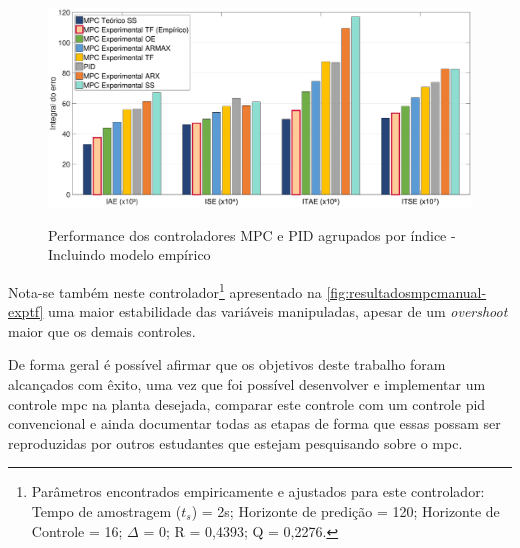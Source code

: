 \begin{figure}[!h]
	\caption{Performance dos controladores MPC e PID agrupados por índice - Incluindo modelo empírico}
	\begin{center}
		\includegraphics[width=1.00\textwidth]{./5_images/ResultadosPerformance_comManual.eps} 
		\label{fig:resultados_performance_com_manual}
	\end{center}
	\centering
\end{figure}

Nota-se também neste controlador\footnote{
    Parâmetros encontrados empiricamente e ajustados para este controlador: Tempo de amostragem ($t_s$) = 2s; Horizonte de predição = 120;
    Horizonte de Controle = 16; $\Delta$ = 0; R = 0,4393; Q = 0,2276.
} apresentado na \cref{fig:resultadosmpcmanual-exptf} uma maior estabilidade
das variáveis manipuladas, apesar de um \textit{overshoot} maior que os demais controles.

De forma geral é possível afirmar que os objetivos deste trabalho foram alcançados com êxito, uma vez que foi
possível desenvolver e implementar um controle \acrshort{mpc} na planta desejada, comparar este controle 
com um controle \acrshort{pid} convencional e ainda documentar todas as etapas de forma que essas possam ser reproduzidas
por outros estudantes que estejam pesquisando sobre o \acrlong{mpc}.


